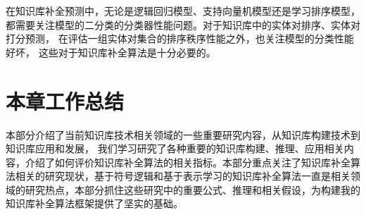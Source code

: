 在知识库补全预测中，无论是逻辑回归模型、支持向量机模型还是学习排序模型，
都需要关注模型的二分类的分类器性能问题。对于知识库中的实体对排序、实体对打分预测，
在评估一组实体对集合的排序秩序性能之外，也关注模型的分类性能好坏，
这些对于知识库补全算法是十分必要的。

\section{本章工作总结}

本部分介绍了当前知识库技术相关领域的一些重要研究内容，从知识库构建技术到知识库应用和发展，
我们学习研究了各种重要的知识库构建、推理、应用相关内容，介绍了如何评价知识库补全算法的相关指标。本部分重点关注了知识库补全算法相关的研究现状，基于符号逻辑和基于表示学习的知识库补全算法一直是相关领域的研究热点，本部分抓住这些研究中的重要公式、推理和相关假设，为构建我的知识库补全算法框架提供了坚实的基础。







